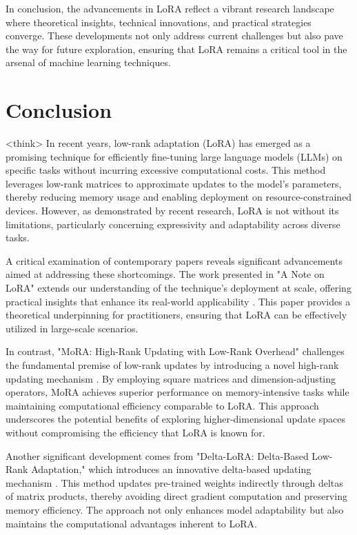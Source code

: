 \documentclass[conference]{IEEEtran}
\begin{document}
In conclusion, the advancements in LoRA reflect a vibrant research landscape where theoretical insights, technical innovations, and practical strategies converge. These developments not only address current challenges but also pave the way for future exploration, ensuring that LoRA remains a critical tool in the arsenal of machine learning techniques.

\section{Conclusion}
<think>
In recent years, low-rank adaptation (LoRA) has emerged as a promising technique for efficiently fine-tuning large language models (LLMs) on specific tasks without incurring excessive computational costs. This method leverages low-rank matrices to approximate updates to the model's parameters, thereby reducing memory usage and enabling deployment on resource-constrained devices. However, as demonstrated by recent research, LoRA is not without its limitations, particularly concerning expressivity and adaptability across diverse tasks.

A critical examination of contemporary papers reveals significant advancements aimed at addressing these shortcomings. The work presented in "A Note on LoRA" extends our understanding of the technique's deployment at scale, offering practical insights that enhance its real-world applicability \cite{a1}. This paper provides a theoretical underpinning for practitioners, ensuring that LoRA can be effectively utilized in large-scale scenarios.

In contrast, "MoRA: High-Rank Updating with Low-Rank Overhead" challenges the fundamental premise of low-rank updates by introducing a novel high-rank updating mechanism \cite{b2}. By employing square matrices and dimension-adjusting operators, MoRA achieves superior performance on memory-intensive tasks while maintaining computational efficiency comparable to LoRA. This approach underscores the potential benefits of exploring higher-dimensional update spaces without compromising the efficiency that LoRA is known for.

Another significant development comes from "Delta-LoRA: Delta-Based Low-Rank Adaptation," which introduces an innovative delta-based updating mechanism \cite{c3}. This method updates pre-trained weights indirectly through deltas of matrix products, thereby avoiding direct gradient computation and preserving memory efficiency. The approach not only enhances model adaptability but also maintains the computational advantages inherent to LoRA.
\end{document}
